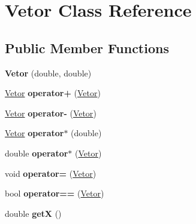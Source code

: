 \hypertarget{classVetor}{\section{\-Vetor \-Class \-Reference}
\label{classVetor}
}
\subsection*{\-Public \-Member \-Functions}
\begin{DoxyCompactItemize}
\item 
\hypertarget{classVetor_a1c89dbafcc53db7c1794e5e0ba4cf480}{{\bfseries \-Vetor} (double, double)}\label{classVetor_a1c89dbafcc53db7c1794e5e0ba4cf480}

\item 
\hypertarget{classVetor_a58169b855673936bce05d95067b1bef1}{\hyperlink{classVetor}{\-Vetor} {\bfseries operator+} (\hyperlink{classVetor}{\-Vetor})}\label{classVetor_a58169b855673936bce05d95067b1bef1}

\item 
\hypertarget{classVetor_ab814f53966625ab22821ff6f2f5a4d1c}{\hyperlink{classVetor}{\-Vetor} {\bfseries operator-\/} (\hyperlink{classVetor}{\-Vetor})}\label{classVetor_ab814f53966625ab22821ff6f2f5a4d1c}

\item 
\hypertarget{classVetor_a683b57df149b79773594458f4e4a9188}{\hyperlink{classVetor}{\-Vetor} {\bfseries operator$\ast$} (double)}\label{classVetor_a683b57df149b79773594458f4e4a9188}

\item 
\hypertarget{classVetor_ad38f456c8b902dc125269ae86fa5b36e}{double {\bfseries operator$\ast$} (\hyperlink{classVetor}{\-Vetor})}\label{classVetor_ad38f456c8b902dc125269ae86fa5b36e}

\item 
\hypertarget{classVetor_a69044c52a1f7820172e93d8d3f9cb15f}{void {\bfseries operator=} (\hyperlink{classVetor}{\-Vetor})}\label{classVetor_a69044c52a1f7820172e93d8d3f9cb15f}

\item 
\hypertarget{classVetor_ac4499f2c85a8823c868678cb6b219efb}{bool {\bfseries operator==} (\hyperlink{classVetor}{\-Vetor})}\label{classVetor_ac4499f2c85a8823c868678cb6b219efb}

\item 
\hypertarget{classVetor_a9f8dcfa551a53cce07373342bc9ec8c3}{double {\bfseries get\-X} ()}\label{classVetor_a9f8dcfa551a53cce07373342bc9ec8c3}


\end{DoxyCompactItemize}
